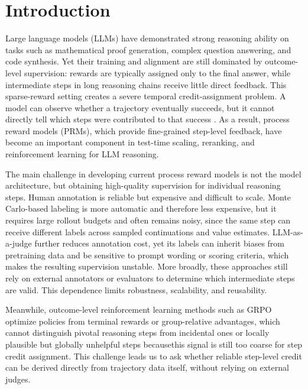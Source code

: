 \section{Introduction}

Large language models (LLMs) have demonstrated strong reasoning ability on
tasks such as mathematical proof generation, complex question answering, and
code synthesis.
Yet their training and alignment are still dominated by outcome-level
supervision: rewards are typically assigned only to the final answer, while
intermediate steps in long reasoning chains receive little direct feedback.
This sparse-reward setting creates a severe temporal credit-assignment
problem.
A model can observe whether a trajectory eventually succeeds, but it cannot
directly tell which steps were contributed to  that success
\citep{uesato2022solving, lightman2023lets}.
As a result, process reward models (PRMs), which provide fine-grained
step-level feedback, have become an important component in test-time scaling,
reranking, and reinforcement learning for LLM reasoning.

The main challenge in developing current process reward models is not the
model architecture, but obtaining high-quality supervision for individual
reasoning steps.
Human annotation is reliable but expensive and difficult to scale.
Monte Carlo-based labeling is more automatic and therefore less expensive,
but it requires large rollout budgets and often remains noisy, since the
same step can receive different labels across sampled continuations and
value estimates.
LLM-as-a-judge further reduces annotation cost, yet its labels can inherit
biases from pretraining data and be sensitive to prompt wording or scoring
criteria, which makes the resulting supervision unstable.
More broadly, these approaches still rely on external annotators or
evaluators to determine which intermediate steps are valid.
This dependence limits robustness, scalability, and reusability.



Meanwhile, outcome-level reinforcement learning methods such as GRPO
optimize policies from terminal rewards or group-relative advantages,
which cannot distinguish pivotal reasoning steps from incidental
ones or locally plausible but globally unhelpful steps becausethis signal is still too coarse for step credit
assignment.
This challenge leads us to ask whether reliable step-level credit can be derived
directly from trajectory data itself, without relying on external judges.



